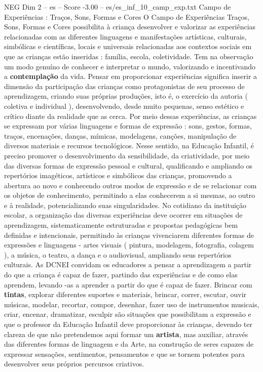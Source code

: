 \begin{textsample}{NEG Dim 2 – es – Score -3.00 – es/es\_inf\_10\_camp\_exp.txt}  \label{ex:f2_neg_072}
Campo de Experiências : Traços, Sons, Formas e Cores O Campo de Experiências Traços, Sons, Formas e Cores possibilita à criança desenvolver e valorizar as experiências relacionadas com as diferentes linguagens e manifestações artísticas, culturais, simbólicas e científicas, locais e universais relacionadas aos contextos sociais em que as crianças estão inseridas : família, escola, coletividade.
Tem na observação um modo genuíno de conhecer e interpretar o mundo, valorizando e incentivando a \textbf{contemplação} da vida.
Pensar em proporcionar experiências significa inserir a dimensão da participação das crianças como protagonistas de seu processo de aprendizagem, criando suas próprias produções, isto é, o exercício da autoria ( coletiva e individual ), desenvolvendo, desde muito pequenas, senso estético e crítico diante da realidade que as cerca.
Por meio dessas experiências, as crianças se expressam por várias linguagens e formas de expressão : sons, gestos, formas, traços, encenações, danças, mímicas, modelagens, canções, manipulação de diversos materiais e recursos tecnológicos.
Nesse sentido, na Educação Infantil, é preciso promover o desenvolvimento da sensibilidade, da criatividade, por meio das diversas formas de expressão pessoal e cultural, qualificando e ampliando os repertórios imagéticos, artísticos e simbólicos das crianças, promovendo a abertura ao novo e conhecendo outros modos de expressão e de se relacionar com os objetos de conhecimento, permitindo a elas conhecerem a si mesmas, ao outro e à realidade, potencializando suas singularidades.
No cotidiano da instituição escolar, a organização das diversas experiências deve ocorrer em situações de aprendizagem, sistematicamente estruturadas e propostas pedagógicas bem definidas e intencionais, permitindo às crianças vivenciarem diferentes formas de expressões e linguagens - artes visuais ( pintura, modelagem, fotografia, colagem ), a música, o teatro, a dança e o audiovisual, ampliando seus repertórios culturais.
As DCNEI convidam os educadores a pensar a aprendizagem a partir do que a criança é capaz de fazer, partindo das experiências e de como elas aprendem, levando -as a aprender a partir do que é capaz de fazer.
Brincar com \textbf{tintas}, explorar diferentes suportes e materiais, brincar, correr, escutar, ouvir músicas, modelar, recortar, compor, desenhar, fazer uso de instrumentos musicais, criar, encenar, dramatizar, esculpir são situações que possibilitam a expressão e que o professor da Educação Infantil deve proporcionar às crianças, devendo ter clareza de que não pretendemos aqui formar um \textbf{artista}, mas auxiliar, através das diferentes formas de linguagem e da Arte, na construção de seres capazes de expressar sensações, sentimentos, pensamentos e que se tornem potentes para desenvolver seus próprios percursos criativos.

\end{textsample}

